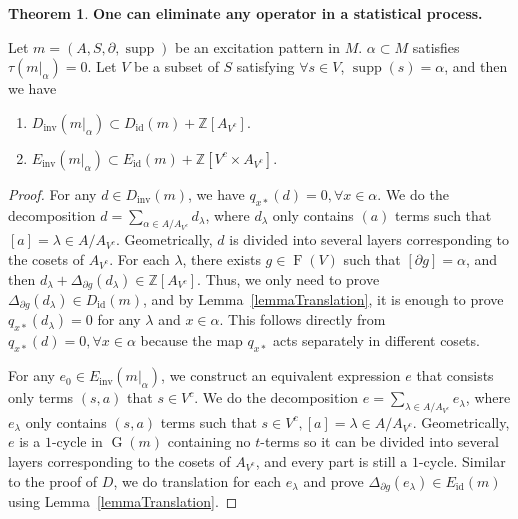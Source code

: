 \documentclass[reprint, amsmath, amssymb, showpacs, floatfix, longbibliography, aps, twocolumn, superscriptaddress, nofootinbib]{revtex4-2}
\newcommand{\ZZ}{{\mathbb Z}}
\newcommand{\supp}{\operatorname{supp}}
\newcommand{\id}{{\operatorname{id}}}
\newcommand{\inv}{{\operatorname{inv}}}
\theoremstyle{definition}
\newtheorem{theorem}{Theorem}[section]
\begin{document}
\begin{theorem}\label{thmReplacable2}\textbf{One can eliminate any operator in a statistical process.}
	
	Let $m=(A,S,\partial,\supp)$ be an excitation pattern in $M$. $\alpha\subset M$ satisfies $\tau(m|_\alpha)=0$. Let $V$ be a subset of $S$ satisfying $\forall s\in V$, $\supp(s)=\alpha$, and then we have
	\begin{enumerate}
		\item $D_\inv(m|_\alpha)\subset D_\id(m)+\ZZ[A_{V^c}]$.
		\item $E_\inv(m|_\alpha)\subset E_\id(m)+\ZZ[V^c\times A_{V^c}]$.
	\end{enumerate}
	
\end{theorem}
\begin{proof}
	
	For any $d\in D_{\operatorname{inv}}(m)$, we have $q_{x*}(d)=0,\forall x\in \alpha$. We do the decomposition $d=\sum_{\alpha\in A/A_{V^c}}d_\lambda$, where $d_\lambda$ only contains $(a)$ terms such that $[a]=\lambda\in A/A_{V^c}$. Geometrically, $d$ is divided into several layers corresponding to the cosets of $A_{V^c}$. For each $\lambda$, there exists  $g\in \operatorname{F}(V)$ such that $[\partial g]=\alpha$, and then $d_\lambda+\Delta_{\partial g}(d_\lambda)\in \ZZ[A_{V^c}]$. Thus, we only need to prove $\Delta_{\partial g}(d_\lambda)\in D_\id(m)$, and by Lemma~\ref{lemmaTranslation}, it is enough to prove $q_{x*}(d_\lambda)=0$ for any $\lambda$ and $x\in \alpha$. This follows directly from $q_{x*}(d)=0,\forall x\in \alpha$ because the map $q_{x*}$ acts separately in different cosets.
	
	For any $e_0\in E_{\operatorname{inv}}(m|_\alpha)$, we construct an equivalent expression $e$ that consists only terms $(s,a)$ that $s\in {V^c}$. We do the decomposition $e=\sum_{\lambda\in A/A_{V^c}}e_\lambda$, where $e_\lambda$ only contains $(s,a)$ terms such that $s\in {V^c}, [a]=\lambda\in A/A_{V^c}$. Geometrically, $e$ is a $1$-cycle in $\operatorname{G}(m)$ containing no $t$-terms so it can be divided into several layers corresponding to the cosets of $A_{V^c}$, and every part is still a $1$-cycle. Similar to the proof of $D$, we do translation for each $e_\lambda$ and prove $\Delta_{\partial g}(e_\lambda)\in E_\id(m)$ using Lemma~\ref{lemmaTranslation}.
\end{proof}
\end{document}
